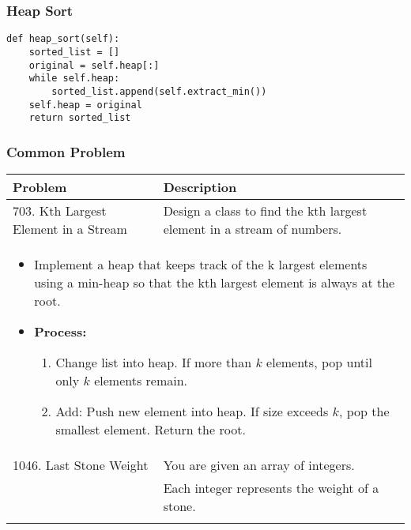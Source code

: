 \subsubsection{Heap Sort}
\begin{algo}
\begin{lstlisting}
def heap_sort(self):
    sorted_list = []
    original = self.heap[:]
    while self.heap:
        sorted_list.append(self.extract_min())
    self.heap = original
    return sorted_list
\end{lstlisting}
\end{algo}
\newpage

\subsubsection{Common Problem}
\begin{summary}
    \begin{center}
        \begin{tabular}{ll}
            \toprule
            \textbf{Problem} & \textbf{Description} \\
            \midrule
            703. Kth Largest Element in a Stream & Design a class to find the kth largest element in a stream of numbers. \\
            \multicolumn{2}{p{\linewidth}}{
                    \begin{itemize}
                        \item Implement a heap that keeps track of the k largest elements using a min-heap so that the kth largest element is always at the root. 
                        \item \textbf{Process:}
                        \begin{enumerate}
                            \item Change list into heap. If more than $k$ elements, pop until only $k$ elements remain.
                            \item Add: Push new element into heap. If size exceeds $k$, pop the smallest element. Return the root.
                        \end{enumerate}
                    \end{itemize}
                } \\
            \midrule
            1046. Last Stone Weight & You are given an array of integers. \\
            & Each integer represents the weight of a stone. \\
            \multicolumn{2}{p{\linewidth}}{
}
\end{tabular}
\end{center}
\end{summary}
